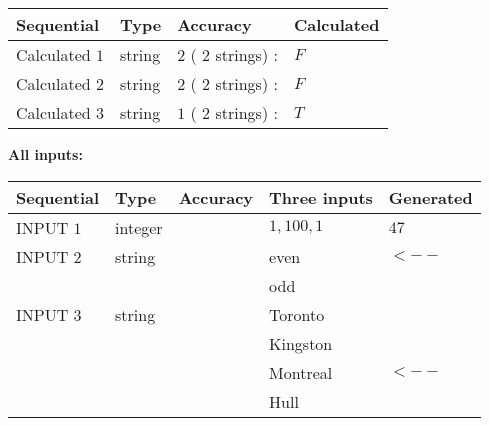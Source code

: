 \documentclass[12pt]{article}
\begin{document}
   
   
   
\noindent{}
   
   
  
  
\noindent\begin{tabular}{|l|l|l|l|}
\hline
 Sequential & Type & Accuracy & Calculated \\ 
\hline
 
 
  Calculated $           1$ & string & $           2 $ ( $          2 $ strings)
 : 
 & $F$
 \\  \hline  
 
 
  Calculated $           2$ & string & $           2 $ ( $          2 $ strings)
 : 
 & $F$
 \\  \hline  
 
 
  Calculated $           3$ & string & $           1 $ ( $          2 $ strings)
 : 
 & $T$
 \\  \hline  
 \end{tabular}
   
   
   
   
\noindent\vspace{0.1in}\hspace{-0.08in} {\textbf{\Large{All inputs: }}}
   
   
  
  
\noindent\begin{tabular}{|l|l|l|l|l|}
\hline
 Sequential & Type & Accuracy & Three inputs & Generated \\ 
\hline
 
 
  INPUT $           1$ & integer &  & $
 1
 , 
 100
 , 
 1
 $ & $ 47 $ 
 \\  \hline  
 
 
  INPUT $           2$ & string & & 
 even & 
  $ <-- $ 
  \\
  & & & 
 odd & 
 \\  \hline  
 
 
  INPUT $           3$ & string & & 
 Toronto & 
  \\
  & & & 
 Kingston & 
  \\
  & & & 
 Montreal & 
  $ <-- $ 
  \\
  & & & 
 Hull & 
 \\  \hline  
 \end{tabular}
   
   
  
\end{document}
